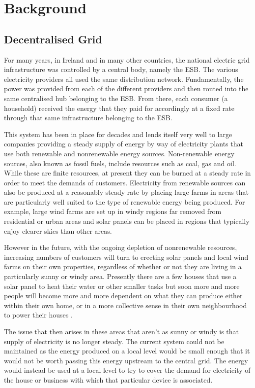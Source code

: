 \documentclass[a4paper, notitlepage]{report}
\begin{document}
\part{Background}
\label{sec:orge9baed8}
\chapter{Decentralised Grid}
\label{sec:orgc1b5f1d}
For many years, in Ireland and in many other countries, the national electric grid
infrastructure was controlled by a central body, namely the ESB. The various
electricity providers all used the same distribution network. Fundamentally, the
power was provided from each of the different providers and then routed into the
same centralised hub belonging to the ESB. From there, each consumer (a
household) received the energy that they paid for accordingly at a fixed rate
through that same infrastructure belonging to the ESB.

This system has been in place for decades and lends itself very well to large
companies providing a steady supply of energy by way of electricity plants
that use both renewable and nonrenewable energy sources. Non-renewable energy
sources, also known as fossil fuels, include resources such as coal, gas and
oil. While these are finite resources, at present they can be burned at a steady
rate in order to meet the demands of customers. Electricity from renewable
sources can also be produced at a reasonably steady rate by placing large farms
in areas that are particularly well suited to the type of renewable energy being
produced. For example, large wind farms are set up in windy regions far removed
from residential or urban areas and solar panels can be placed in regions that
typically enjoy clearer skies than other areas.

However in the future, with the ongoing depletion of nonrenewable resources,
increasing numbers of customers will turn to erecting solar panels and local
wind farms  on their own properties, regardless of whether or not they are
living in a particularly sunny or windy area. Presently there are a few houses
that use a solar panel to heat their water or other smaller tasks but soon more
and more people will become more and more dependent on what they can produce
either within their own home, or in a more collective sense in their own
neighbourhood to power their houses \cite{apergis2010renewable}.

The issue that then arises in these areas that aren’t as sunny or windy is that
supply of electricity is no longer steady. The current system could not be
maintained as the energy produced on a local level would be small enough that it
would not be worth passing this energy upstream to the central grid. The energy
would instead be used at a local level to try to cover the demand for
electricity of the house or business with which that particular device is
associated.
\end{document}
